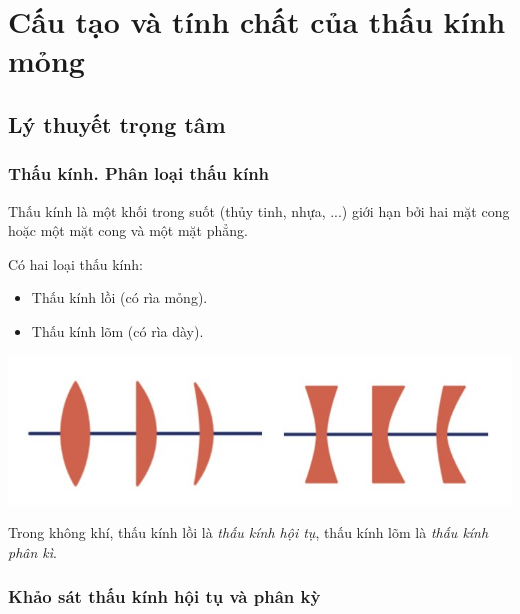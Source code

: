 
\chapter{Cấu tạo và tính chất của thấu kính mỏng}
\section{Lý thuyết trọng tâm}
\subsection{Thấu kính. Phân loại thấu kính}
Thấu kính là một khối trong suốt (thủy tinh, nhựa, ...) giới hạn bởi hai mặt cong hoặc một mặt cong và một mặt phẳng.

Có hai loại thấu kính:

		
	\begin{itemize}
		\item Thấu kính lồi (có rìa mỏng).
		\item Thấu kính lõm (có rìa dày).
			\end{itemize}
\begin{center}
	\includegraphics[scale=0.5]{../figs/VN11-PH-38-L-026-1-h4.jpg}
\end{center}
Trong không khí, thấu kính lồi là \textit{thấu kính hội tụ}, thấu kính lõm là \textit{thấu kính phân kì}.
	\subsection{Khảo sát thấu kính hội tụ và phân kỳ}
	
